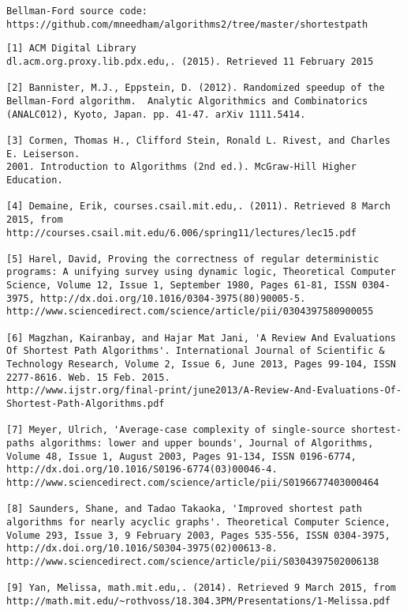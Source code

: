 \documentclass{article}
\begin{document}
\begin{verbatim}
Bellman-Ford source code:
https://github.com/mneedham/algorithms2/tree/master/shortestpath
\end{verbatim}

\begin{lstlisting}
[1] ACM Digital Library
dl.acm.org.proxy.lib.pdx.edu,. (2015). Retrieved 11 February 2015

[2] Bannister, M.J., Eppstein, D. (2012). Randomized speedup of the Bellman-Ford algorithm.  Analytic Algorithmics and Combinatorics (ANALC012), Kyoto, Japan. pp. 41-47. arXiv 1111.5414.

[3] Cormen, Thomas H., Clifford Stein, Ronald L. Rivest, and Charles E. Leiserson.
2001. Introduction to Algorithms (2nd ed.). McGraw-Hill Higher Education. 

[4] Demaine, Erik, courses.csail.mit.edu,. (2011). Retrieved 8 March 2015, from http://courses.csail.mit.edu/6.006/spring11/lectures/lec15.pdf

[5] Harel, David, Proving the correctness of regular deterministic programs: A unifying survey using dynamic logic, Theoretical Computer Science, Volume 12, Issue 1, September 1980, Pages 61-81, ISSN 0304-3975, http://dx.doi.org/10.1016/0304-3975(80)90005-5.
http://www.sciencedirect.com/science/article/pii/0304397580900055

[6] Magzhan, Kairanbay, and Hajar Mat Jani, 'A Review And Evaluations Of Shortest Path Algorithms'. International Journal of Scientific & Technology Research, Volume 2, Issue 6, June 2013, Pages 99-104, ISSN 2277-8616. Web. 15 Feb. 2015.
http://www.ijstr.org/final-print/june2013/A-Review-And-Evaluations-Of-Shortest-Path-Algorithms.pdf

[7] Meyer, Ulrich, 'Average-case complexity of single-source shortest-paths algorithms: lower and upper bounds', Journal of Algorithms, Volume 48, Issue 1, August 2003, Pages 91-134, ISSN 0196-6774, http://dx.doi.org/10.1016/S0196-6774(03)00046-4.
http://www.sciencedirect.com/science/article/pii/S0196677403000464

[8] Saunders, Shane, and Tadao Takaoka, 'Improved shortest path algorithms for nearly acyclic graphs'. Theoretical Computer Science, Volume 293, Issue 3, 9 February 2003, Pages 535-556, ISSN 0304-3975, http://dx.doi.org/10.1016/S0304-3975(02)00613-8.
http://www.sciencedirect.com/science/article/pii/S0304397502006138

[9] Yan, Melissa, math.mit.edu,. (2014). Retrieved 9 March 2015, from http://math.mit.edu/~rothvoss/18.304.3PM/Presentations/1-Melissa.pdf


\end{lstlisting}
\end{document}
